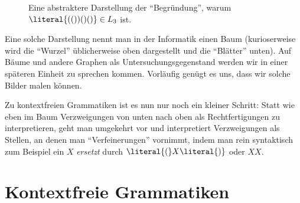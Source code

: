 \begin{figure}[ht]
  \centering
  
  \caption{Eine abstraktere Darstellung der "`Begründung"', warum
    $\literal{(())()()}\in L_3$ ist.} %
  \label{fig:abl-baum-informell}
\end{figure}

Eine solche Darstellung nennt man in der Informatik einen Baum
(kurioserweise wird die "`Wurzel"' üblicherweise oben dargestellt und
die "`Blätter"' unten). Auf Bäume und andere Graphen als
Untersuchungsgegenstand werden wir in einer späteren Einheit zu
sprechen kommen. Vorläufig genügt es uns, dass wir solche Bilder malen
können.

Zu kontextfreien Grammatiken ist es nun nur noch ein kleiner Schritt:
Statt wie eben im Baum Verzweigungen von unten nach oben als
Rechtfertigungen zu interpretieren, geht man umgekehrt vor und
interpretiert Verzweigungen als Stellen, an denen man
"`Verfeinerungen"' vornimmt, indem man rein syntaktisch zum Beispiel
ein $X$ \emph{ersetzt} durch $\literal{(} X \literal{)}$ oder $XX$.

\Tut\section{Kontextfreie Grammatiken}

